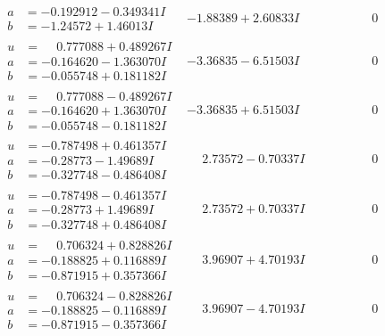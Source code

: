 \documentclass[1p]{elsarticle_modified}
\theoremstyle{definition}
\begin{document}
$$\begin{array}{c|c|c}
\begin{aligned}
a &= -0.192912 - 0.349341 I \\
b &= -1.24572 + 1.46013 I\end{aligned}
 & -1.88389 + 2.60833 I & \phantom{-0.000000 } 0 \\ \hline\begin{aligned}
u &= \phantom{-}0.777088 + 0.489267 I \\
a &= -0.164620 - 1.363070 I \\
b &= -0.055748 + 0.181182 I\end{aligned}
 & -3.36835 - 6.51503 I & \phantom{-0.000000 } 0 \\ \hline\begin{aligned}
u &= \phantom{-}0.777088 - 0.489267 I \\
a &= -0.164620 + 1.363070 I \\
b &= -0.055748 - 0.181182 I\end{aligned}
 & -3.36835 + 6.51503 I & \phantom{-0.000000 } 0 \\ \hline\begin{aligned}
u &= -0.787498 + 0.461357 I \\
a &= -0.28773 - 1.49689 I \\
b &= -0.327748 - 0.486408 I\end{aligned}
 & \phantom{-}2.73572 - 0.70337 I & \phantom{-0.000000 } 0 \\ \hline\begin{aligned}
u &= -0.787498 - 0.461357 I \\
a &= -0.28773 + 1.49689 I \\
b &= -0.327748 + 0.486408 I\end{aligned}
 & \phantom{-}2.73572 + 0.70337 I & \phantom{-0.000000 } 0 \\ \hline\begin{aligned}
u &= \phantom{-}0.706324 + 0.828826 I \\
a &= -0.188825 + 0.116889 I \\
b &= -0.871915 + 0.357366 I\end{aligned}
 & \phantom{-}3.96907 + 4.70193 I & \phantom{-0.000000 } 0 \\ \hline\begin{aligned}
u &= \phantom{-}0.706324 - 0.828826 I \\
a &= -0.188825 - 0.116889 I \\
b &= -0.871915 - 0.357366 I\end{aligned}
 & \phantom{-}3.96907 - 4.70193 I & \phantom{-0.000000 } 0 \\ \hline\begin{aligned}

\end{aligned}
\end{array}$$
\end{document}
